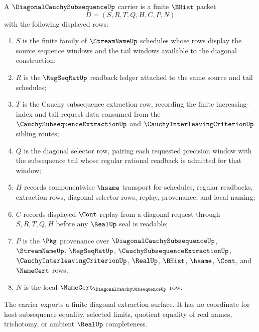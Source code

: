 \begin{definition}
\label{def:diagonal-cauchy-subsequence-carrier}
A $\DiagonalCauchySubsequenceUp$ carrier is a finite $\BHist$ packet
$$
D=(S,R,T,Q,H,C,P,N)
$$
with the following displayed rows:
\begin{enumerate}
\item $S$ is the finite family of $\StreamNameUp$ schedules whose rows display the source sequence windows and the tail windows available to the diagonal construction;
\item $R$ is the $\RegSeqRatUp$ readback ledger attached to the same source and tail schedules;
\item $T$ is the Cauchy subsequence extraction row, recording the finite increasing-index and tail-request data consumed from the $\CauchySubsequenceExtractionUp$ and $\CauchyInterleavingCriterionUp$ sibling routes;
\item $Q$ is the diagonal selector row, pairing each requested precision window with the subsequence tail whose regular rational readback is admitted for that window;
\item $H$ records componentwise $\hsame$ transport for schedules, regular readbacks, extraction rows, diagonal selector rows, replay, provenance, and local naming;
\item $C$ records displayed $\Cont$ replay from a diagonal request through $S,R,T,Q,H$ before any $\RealUp$ seal is readable;
\item $P$ is the $\Pkg$ provenance over $\DiagonalCauchySubsequenceUp$, $\StreamNameUp$, $\RegSeqRatUp$, $\CauchySubsequenceExtractionUp$, $\CauchyInterleavingCriterionUp$, $\RealUp$, $\BHist$, $\hsame$, $\Cont$, and $\NameCert$ rows;
\item $N$ is the local $\NameCert_{\DiagonalCauchySubsequenceUp}$ row.
\end{enumerate}
The carrier exports a finite diagonal extraction surface. It has no coordinate for host subsequence equality, selected limits, quotient equality of real names, trichotomy, or ambient $\RealUp$ completeness.
\end{definition}

